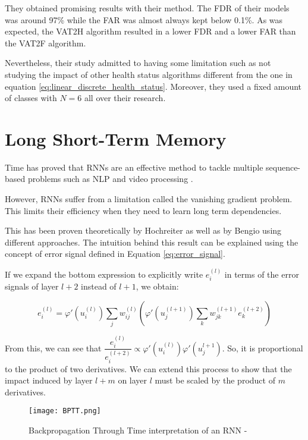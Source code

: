 They obtained promising results with their method.
The FDR of their models was around 97\% while the FAR was almost always kept below 0.1\%.
As was expected, the VAT2H algorithm resulted in a lower FDR and a lower FAR than the VAT2F algorithm.

Nevertheless, their study admitted to having some limitation such as not studying the impact of other health status algorithms different from the one in equation \ref{eq:linear_discrete_health_status}.
Moreover, they used a fixed amount of classes with $N=6$ all over their research.

\section{Long Short-Term Memory}\label{sec:lstm}

Time has proved that RNNs are an effective method to tackle multiple sequence-based problems such as NLP \cite{tarwani2017survey} and video processing \cite{yadav2022survey}.

However, RNNs suffer from a limitation called the vanishing gradient problem.
This limits their efficiency when they need to learn long term dependencies.

This has been proven theoretically by Hochreiter \cite{hochreiter1998vanishing} as well as by Bengio \cite{bengio1993problem} using different approaches.
The intuition behind this result can be explained using the concept of error signal defined in Equation \ref{eq:error_signal}.

If we expand the bottom expression to explicitly write $e_i^{(l)}$ in terms of the error signals of layer $l+2$ instead of $l+1$, we obtain:

\begin{equation}
    e_i^{(l)} = \varphi '(u_i^{(l)}) \sum_j w_{ij}^{(l)} \left(\varphi '(u_j^{(l+1)}) \sum_k w_{jk}^{(l+1)} e_k^{(l+2)}\right)
\end{equation}

From this, we can see that $\dfrac{e_i^{(l)}}{e_i^{(l+2)}} \propto \varphi '(u_i^{(l)})\varphi '(u_j^{l+1})$.
So, it is proportional to the product of two derivatives.
We can extend this process to show that the impact induced by layer $l + m$ on layer $l$ must be scaled by the product of $m$ derivatives.

\begin{figure}
    \begin{center}
        \texttt{[image: BPTT.png]}
        \caption[Backpropagation Through Time]{Backpropagation Through Time interpretation of an RNN - \cite{Xu16}}
        \label{fig:BPTT}
    \end{center}
\end{figure}

